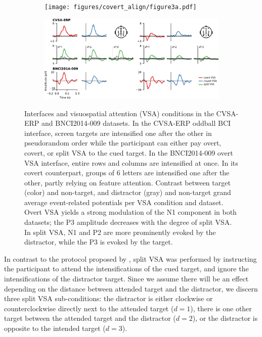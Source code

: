 \begin{figure}
  \bigskip
	\begin{subfigure}{\linewidth}
		\caption{}
		\label{fig:interface}
		\texttt{[image: figures/covert\_align/figure3a.pdf]}
	\end{subfigure}

	\bigskip
	\bigskip
	\begin{subfigure}{\linewidth}
		\caption{}
		\label{fig:erps}
		\includegraphics[width=\linewidth]{figures/covert_align/figure3b.pdf}
	\end{subfigure}%

  \caption[Stimulation interfaces and evoked \acp{erp}.]{
		 Interfaces and visuospatial attention (VSA)
    conditions in the CVSA-ERP and BNCI2014-009 datasets.
		In the CVSA-ERP oddball BCI interface, screen targets are intensified one after
    the other in pseudorandom order while the participant can either pay overt,
    covert, or split VSA to the cued target.
		In the BNCI2014-009 overt VSA interface, entire rows and columns are
		intensified at once. In its covert counterpart,
		groups of 6 letters are intensified one after the other, partly relying on
    feature attention.
		 Contrast between target (color) and non-target, and
    distractor (gray) and non-target grand average event-related potentials per VSA condition and dataset.
    Overt VSA yields a strong modulation of the N1 component in both datasets;
    the P3 amplitude decreases with the degree of split VSA.
    In split VSA, N1 and P2 are more prominently evoked by the distractor,
    while the P3 is evoked by the target.
	}
\end{figure}

In contrast to the protocol proposed by \cite{Frenzel2011}, split VSA was
performed by instructing the participant to attend the intensifications of the
cued target, and ignore the intensifications of the distractor target.
Since we assume there will be an effect depending on the distance between
attended target and the distractor, we discern three split VSA sub-conditions:
the distractor is either clockwise or counterclockwise directly next to the
attended target ($d=1$), there is one other target between the attended target and
the distractor ($d=2$), or the distractor is opposite to the intended target
($d=3$).

